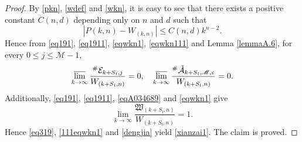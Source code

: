 \documentclass[11pt]{article}
\theoremstyle{plain}
\theoremstyle{definition}
\begin{document}
{\begin{proof}
By \eqref{pkn}, \eqref{wdef} and \eqref{wkn}, it is easy to see that there exists a positive constant $C(n,d)$ depending only on $n$ and $d$ such that 
\begin{equation} \label{eqwkn1}
	|P(k,n)-W_{(k,n)}|\leq C(n,d) k^{n-2}.
\end{equation}
     Hence from \eqref{eq191}, \eqref{eq1911}, \eqref{eqwkn1}, \eqref{eqwkn111} and Lemma \ref{lemmaA.6}, for every $0 \le j \le \mathscr{M}-1$,
	\begin{equation} \label{111eqwkn1}\varlimsup_{k\to \infty} \frac{^{\#  } \mathcal{E}_{k+S_{\mathfrak{l}},j}  }{W_{(k+S_{\mathfrak{l}},n)}}=0, \quad
	\varlimsup_{k\to \infty} \frac{^{\#  } \check{\mathcal{A}}_{k+S_{\mathfrak{l}},\mathscr{M},\varepsilon }  }{W_{(k+S_{\mathfrak{l}},n)}} = 0.\end{equation}
Additionally, \eqref{eq191}, \eqref{eq1911}, \eqref{eqA034689} and \eqref{eqwkn1} give 
\begin{equation} \label{dengjia}\lim\limits_{k\to \infty} \frac{\mathfrak{W}_{(k+S_{\mathfrak{l}},n)}  }{W_{(k+S_{\mathfrak{l}},n)}} = 1.\end{equation}
Hence \eqref{eq319}, \eqref{111eqwkn1} and \eqref{dengjia}  yield \eqref{xianzai1}.
The claim is proved.


\end{proof}}
\end{document}
